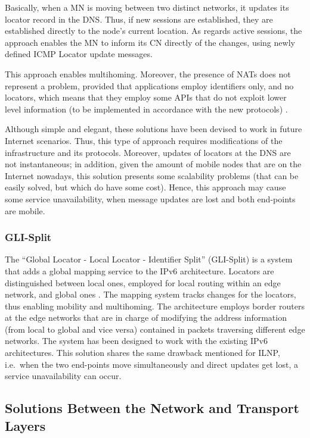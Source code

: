 \documentclass[preprint,12pt]{elsarticle}
\begin{document}
Basically, when a MN is moving between two distinct networks, it updates 
its locator record in the DNS. Thus, if new sessions are established, they are 
established directly to the node's current location.
As regards active sessions, the approach enables the MN to inform its CN directly of 
the changes, using newly defined ICMP Locator update messages. 

This approach enables multihoming. Moreover, the 
presence of NATs does not represent a problem, provided that applications employ 
identifiers only, and no locators, which means that they employ some \acp{API} that do not exploit 
lower level information (to be implemented in accordance with the new protocols) \cite{Atkinson:2007}.

Although simple and elegant, these solutions have been devised to work in future Internet 
scenarios. Thus, this type of approach requires modifications of the 
infrastructure and its protocols. 
Moreover, updates of locators at the DNS are not instantaneous; in addition, given the amount of mobile nodes that are on the Internet nowadays, this solution presents some scalability problems (that can be easily solved, but which do have some cost). Hence, this approach may cause some service 
unavailability, when message updates are lost and both end-points are 
mobile.

\subsubsection{GLI-Split}
The ``Global Locator - Local Locator - Identifier Split'' (GLI-Split) is a system that
adds a global mapping service to the IPv6 architecture. Locators are 
distinguished between local ones, employed for local routing within an edge 
network, and global ones \cite{gli-split}. The mapping system tracks changes 
for the locators, thus enabling mobility and multihoming. 
The architecture employs border routers at the edge networks that are in charge 
of modifying the address information (from local to global and vice versa)
contained in packets traversing different edge networks.
The system has been designed to work with the existing IPv6 architectures. This 
solution shares the same drawback mentioned for ILNP, i.e.~when the two 
end-points move simultaneously and direct updates get lost, a service 
unavailability can occur.

\subsection{Solutions Between the Network and Transport Layers}
\end{document}
